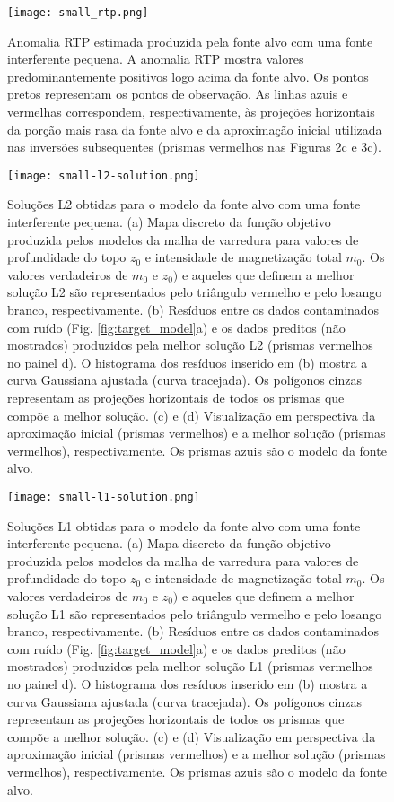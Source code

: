 \begin{figure}[!htb]
	\centering
	\texttt{[image: small\_rtp.png]}
	\caption{Anomalia RTP estimada produzida pela fonte alvo com uma fonte interferente pequena. 
		A anomalia RTP mostra valores predominantemente positivos logo acima da fonte alvo. Os pontos pretos representam os pontos de observação. As linhas azuis e vermelhas correspondem, respectivamente, às projeções horizontais da porção mais rasa da fonte alvo e da aproximação inicial utilizada nas inversões subsequentes (prismas vermelhos nas Figuras \ref{fig:small_l2_result}c e 
		\ref{fig:small_l1_result}c).
	}
	\label{fig:small_model_rtp}
\end{figure}

\begin{figure}[!htb]
	\centering
	\texttt{[image: small-l2-solution.png]}
	\caption{Soluções L2 obtidas para o modelo da fonte alvo com uma fonte interferente pequena. 
		(a) Mapa discreto da função objetivo produzida pelos modelos da malha de varredura para valores de profundidade do topo $z_{0}$ e intensidade de magnetização total $m_{0}$. 
		Os valores verdadeiros de $m_{0}$ e $z_{0})$ e aqueles que definem a melhor solução L2 são representados pelo triângulo vermelho e pelo losango branco, respectivamente.
		(b) Resíduos entre os dados contaminados com ruído (Fig. \ref{fig:target_model}a) 
		e os dados preditos (não mostrados) produzidos pela melhor solução L2 (prismas vermelhos no painel d). 
		O histograma dos resíduos inserido em (b) mostra a curva Gaussiana ajustada (curva tracejada).
		Os polígonos cinzas representam as projeções horizontais de todos os prismas que compõe a melhor solução. 
		(c) e (d) Visualização em perspectiva da aproximação inicial (prismas vermelhos) e 
		a melhor solução (prismas vermelhos), respectivamente. Os prismas azuis são o modelo da fonte alvo.
	}
	\label{fig:small_l2_result}
\end{figure}

\begin{figure}[!htb]
	\centering
	\texttt{[image: small-l1-solution.png]}
	\caption{Soluções L1 obtidas para o modelo da fonte alvo com uma fonte interferente pequena. 
		(a) Mapa discreto da função objetivo produzida pelos modelos da malha de varredura para valores de profundidade do topo $z_{0}$ e intensidade de magnetização total $m_{0}$. 
		Os valores verdadeiros de $m_{0}$ e $z_{0})$ e aqueles que definem a melhor solução L1 são representados pelo triângulo vermelho e pelo losango branco, respectivamente.
		(b) Resíduos entre os dados contaminados com ruído (Fig. \ref{fig:target_model}a) 
		e os dados preditos (não mostrados) produzidos pela melhor solução L1 (prismas vermelhos no painel d). 
		O histograma dos resíduos inserido em (b) mostra a curva Gaussiana ajustada (curva tracejada).
		Os polígonos cinzas representam as projeções horizontais de todos os prismas que compõe a melhor solução. 
		(c) e (d) Visualização em perspectiva da aproximação inicial (prismas vermelhos) e 
		a melhor solução (prismas vermelhos), respectivamente. Os prismas azuis são o modelo da fonte alvo. 
	}
	\label{fig:small_l1_result}
\end{figure}

